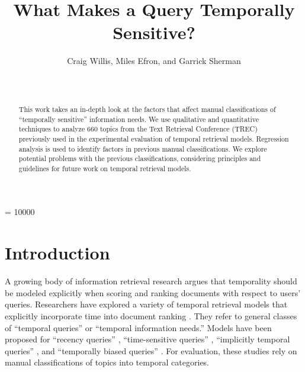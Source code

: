 \documentclass{sig-alternate-05-2015}
\begin{document}

\author{
Craig Willis, Miles Efron, and Garrick Sherman \\
     \\
       \\
}


\widowpenalty = 10000

\title{What Makes a Query Temporally Sensitive?}

\maketitle

\begin{abstract}
This work takes an in-depth look at the factors that affect manual classifications of ``temporally sensitive'' information needs. We use qualitative and quantitative techniques to analyze 660 topics from the Text Retrieval Conference (TREC) previously used in the experimental evaluation of temporal retrieval models.  Regression analysis is used to identify factors in previous manual classifications. We explore potential problems with the previous classifications, considering principles and guidelines for future work on temporal retrieval models.
\end{abstract}

\section{Introduction}

A growing body of information retrieval research argues that temporality should be modeled explicitly when scoring and ranking documents with respect to users' queries. Researchers have explored a variety of temporal retrieval models that explicitly incorporate time into document ranking \cite{Li2003,Efron2011,Dakka2012}. They refer to general classes of ``temporal queries'' or ``temporal information needs.''  Models have been proposed for ``recency queries'' \cite{Li2003,Efron2011}, ``time-sensitive queries'' \cite{Dakka2012}, ``implicitly temporal queries'' \cite{Metzler2009}, and ``temporally biased queries'' \cite{Jones2007}.  For evaluation,  these studies rely on manual classifications of topics into temporal categories.
\end{document}

